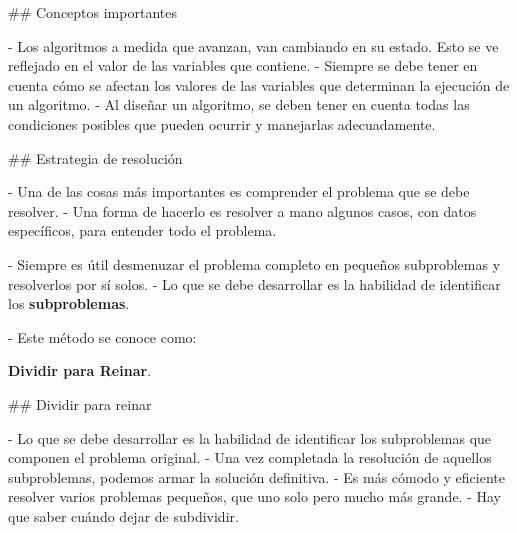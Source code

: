 ## Conceptos importantes

- Los algoritmos a medida que avanzan, van cambiando en su estado. Esto se ve reflejado en el valor de las variables que contiene.
- Siempre se debe tener en cuenta cómo se afectan los valores de las variables que determinan la ejecución de un algoritmo.
- Al diseñar un algoritmo, se deben tener en cuenta todas las condiciones posibles que pueden ocurrir y manejarlas adecuadamente.

## Estrategia de resolución

- Una de las cosas más importantes es comprender el problema que se debe resolver.
    - Una forma de hacerlo es resolver a mano algunos casos, con datos específicos, para entender todo el problema.

\pause
\vfill

- Siempre es útil desmenuzar el problema completo en pequeños subproblemas y resolverlos por sí solos. 
    - Lo que se debe desarrollar es la habilidad de identificar los \textbf{subproblemas}.

\pause
\vfill

- Este método se conoce como:
      \hspace{20mm}\begin{varblock}[.8\textwidth]{}
        \centering  \textbf{Dividir para Reinar}.
      \end{varblock}

## Dividir para reinar

- Lo que se debe desarrollar es la habilidad de identificar los subproblemas  que componen el problema original.
- Una vez completada la resolución de aquellos subproblemas, podemos armar la solución definitiva.
- Es más cómodo y eficiente resolver varios problemas pequeños, que uno solo pero mucho más grande.
- Hay que saber cuándo dejar de subdividir.


